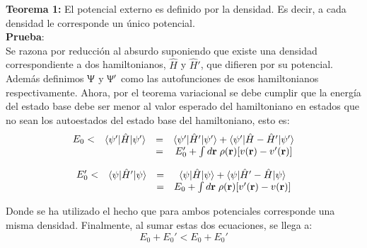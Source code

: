 \documentclass [11pt]{article}
\begin{document}
{\bf Teorema 1:} El potencial externo es definido por la densidad. Es decir, a cada densidad le corresponde un único potencial.\\

{\bf Prueba}:\\
Se razona por reducción al absurdo suponiendo que existe una densidad correspondiente a dos hamiltonianos, $\hat H$ y $\hat H'$, que difieren por su potencial. Además definimos $\Uppsi$ y $\Uppsi'$ como las autofunciones de esos hamiltonianos respectivamente. Ahora, por el teorema variacional se debe cumplir que la energía del estado base debe ser menor al valor esperado del hamiltoniano en estados que no sean los autoestados del estado base del hamiltoniano, esto es:
\begin{equation}
	\begin{array}{c}
	     E_0 < \\
	      \\
	\end{array} 
	\begin{array}{ccc}
	    \langle\psi'|\hat{H}|\psi'\rangle & = & \langle\psi'|\hat{H}'|\psi'\rangle+\langle\psi'|\hat{H}-\hat{H}'|\psi'\rangle \\
	                                      & = & E_0'+\int d{\bf r}\hspace{0.1 cm}\rho({\bf r})[v({\bf r})-v'({\bf r})]
	\end{array}
\end{equation}

\begin{equation}
	\begin{array}{c}
	     E_0' <\\
	     \\
	\end{array} 
	\begin{array}{ccc}
	     \langle\psi|\hat{H}'|\psi\rangle & = & \langle\psi|\hat{H}|\psi\rangle+\langle\psi|\hat{H}'-\hat{H}|\psi\rangle\\
	                                      & = & E_0+\int d{\bf r}\hspace{0.1 cm}\rho({\bf r})[v'({\bf r} )-v({\bf r})]
	\end{array}
\end{equation}

Donde se ha utilizado el hecho que para ambos potenciales corresponde una misma densidad. Finalmente, al sumar estas dos ecuaciones, se llega a:
\begin{equation}
	E_0+E_0' <E_0+E_0'
\end{equation}
\end{document}
